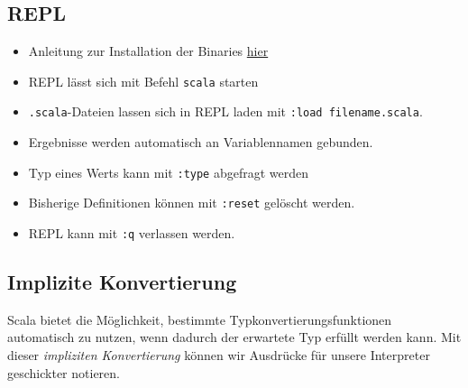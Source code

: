 \documentclass[]{article}
\newenvironment{Shaded}{}{}
\newcommand{\DecValTok}[1]{\textcolor[rgb]{0.25,0.63,0.44}{#1}}
\newcommand{\FunctionTok}[1]{\textcolor[rgb]{0.02,0.16,0.49}{#1}}
\newcommand{\KeywordTok}[1]{\textcolor[rgb]{0.00,0.44,0.13}{\textbf{#1}}}
\newcommand{\NormalTok}[1]{#1}
\newcommand{\StringTok}[1]{\textcolor[rgb]{0.25,0.44,0.63}{#1}}
\providecommand{\tightlist}{%
  \setlength{\itemsep}{0pt}\setlength{\parskip}{0pt}}
\begin{document}
\begin{Shaded}
\end{Shaded}

\hypertarget{repl}{%
\subsection{REPL}\label{repl}}

\begin{itemize}
\tightlist
\item
  Anleitung zur Installation der Binaries
  \href{https://www.scala-lang.org/download/}{hier}
\item
  REPL lässt sich mit Befehl \texttt{scala} starten
\item
  \texttt{.scala}-Dateien lassen sich in REPL laden mit
  \texttt{:load\ filename.scala}.
\item
  Ergebnisse werden automatisch an Variablennamen gebunden.
\item
  Typ eines Werts kann mit \texttt{:type} abgefragt werden
\item
  Bisherige Definitionen können mit \texttt{:reset} gelöscht werden.
\item
  REPL kann mit \texttt{:q} verlassen werden.
\end{itemize}

\hypertarget{implizite-konvertierung}{%
\subsection{Implizite Konvertierung}\label{implizite-konvertierung}}

Scala bietet die Möglichkeit, bestimmte Typkonvertierungsfunktionen
automatisch zu nutzen, wenn dadurch der erwartete Typ erfüllt werden
kann. Mit dieser \emph{impliziten Konvertierung} können wir Ausdrücke
für unsere Interpreter geschickter notieren.
\end{document}
